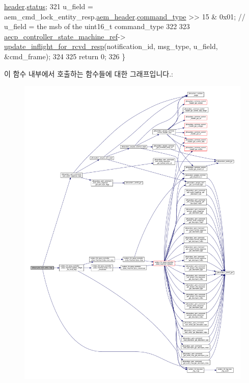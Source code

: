 \begin{DoxyCode}
      \hyperlink{structjdksavdecc__aecpdu__common_a314cacb6a61bcf18749030c0b6fb7510}{header}.\hyperlink{structjdksavdecc__aecpdu__common__control__header_ade818037fd6c985038ff29656089758d}{status};
321     u\_field = aem\_cmd\_lock\_entity\_resp.\hyperlink{structjdksavdecc__aem__command__lock__entity__response_ae1e77ccb75ff5021ad923221eab38294}{aem\_header}.\hyperlink{structjdksavdecc__aecpdu__aem_a07f7ee802870e9ae75f021832f59a8a9}{command\_type} >> 15 & 0x01; \textcolor{comment}{//
       u\_field = the msb of the uint16\_t command\_type}
322 
323     \hyperlink{namespaceavdecc__lib_a0b1b5aea3c0490f77cbfd9178af5be22}{aecp\_controller\_state\_machine\_ref}->
      \hyperlink{classavdecc__lib_1_1aecp__controller__state__machine_a997abd9786c330a5505e903e6443208e}{update\_inflight\_for\_rcvd\_resp}(notification\_id, msg\_type, u\_field, &cmd\_frame);
324 
325     \textcolor{keywordflow}{return} 0;
326 \}
\end{DoxyCode}


이 함수 내부에서 호출하는 함수들에 대한 그래프입니다.\+:
\nopagebreak
\begin{figure}[H]
\begin{center}
\leavevmode
\includegraphics[width=350pt]{classavdecc__lib_1_1descriptor__base__imp_a3b3582020613e7f60efe96567679be7f_cgraph}
\end{center}
\end{figure}




